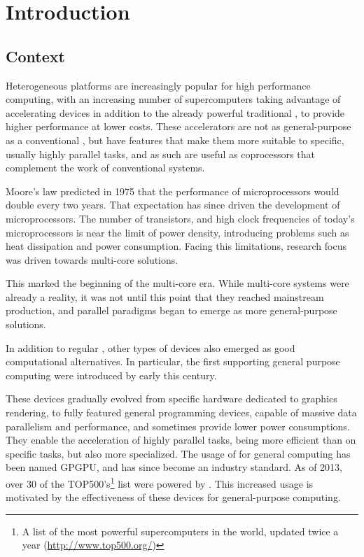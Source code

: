 \documentclass[main.tex]{subfiles}
\begin{document}
\chapter{Introduction}

\section{Context}

Heterogeneous platforms are increasingly popular for high performance computing, with an increasing number of supercomputers taking advantage of accelerating devices in addition to the already powerful traditional \cpus, to provide higher performance at lower costs. These accelerators are not as general-purpose as a conventional \cpu, but have features that make them more suitable to specific, usually highly parallel tasks, and as such are useful as coprocessors that complement the work of conventional systems.

Moore's law \cite{moore1965cramming,moore1975progress} predicted in 1975 that the performance of microprocessors would double every two years. That expectation has since driven the development of microprocessors. The number of transistors, and high clock frequencies of today's microprocessors is near the limit of power density, introducing problems such as heat dissipation and power consumption. Facing this limitations, research focus was driven towards multi-core solutions.

This marked the beginning of the multi-core era. While multi-core systems were already a reality, it was not until this point that they reached mainstream production, and parallel paradigms began to emerge as more general-purpose solutions.

In addition to regular \cpus, other types of devices also emerged as good computational alternatives. In particular, the first \gpus supporting general purpose computing were introduced by \nvidia early this century.

These devices gradually evolved from specific hardware dedicated to graphics rendering, to fully featured general programming devices, capable of massive data parallelism and performance, and sometimes provide lower power consumptions.
They enable the acceleration of highly parallel tasks, being more efficient than \cpus on specific tasks, but also more specialized. The usage of \gpus for general computing has been named \ac{GPGPU}, and has since become an industry standard.
As of 2013, over 30 of the TOP500's\footnote{A list of the most powerful supercomputers in the world, updated twice a year (\url{http://www.top500.org/})} list were powered by \gpus. This increased usage is motivated by the effectiveness of these devices for general-purpose computing.
\end{document}
